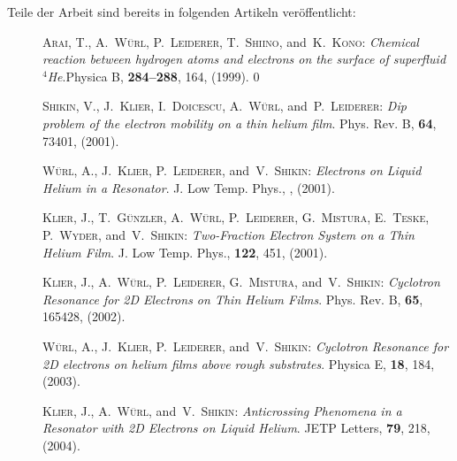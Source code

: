 Teile der Arbeit sind bereits in folgenden Artikeln veröffentlicht:

\begin{description}
	\item[\cite{Ara99}] \textsc{Arai, T.}, \textsc{A.~W{\"u}rl}, \textsc{P.~Leiderer}, \textsc{T.~Shiino}, and\ \textsc{K.~Kono}: {\em {C}hemical reaction between hydrogen atoms and electrons on the surface of superfluid {$^4$}{H}e}.\newblock Physica B, \textbf{284--288}, 164, (1999).
0
	\item[\cite{Shi01}] \textsc{Shikin, V.}, \textsc{J.~Klier}, \textsc{I.~Doicescu}, \textsc{A.~W{\"u}rl}, and\ \textsc{P.~Leiderer}: {\em {D}ip problem of the electron mobility on a thin helium film}. \newblock Phys. Rev. B, \textbf{64}, 73401, (2001).
	
	\item[\cite{Wue01}] \textsc{W{\"u}rl, A.}, \textsc{J.~Klier}, \textsc{P.~Leiderer}, and\ \textsc{V.~Shikin}: {\em {E}lectrons on {L}iquid {H}elium in a {R}esonator}. \newblock J. Low Temp. Phys., \textbf{}, (2001).
	
	\item[\cite{Kli01}] \textsc{Klier, J.}, \textsc{T.~G{\"u}nzler}, \textsc{A.~W{\"u}rl}, \textsc{P.~Leiderer}, \textsc{G.~Mistura}, \textsc{E.~Teske}, \textsc{P.~Wyder}, and\ \textsc{V.~Shikin}: {\em {T}wo-{F}raction {E}lectron {S}ystem on a {T}hin {H}elium {F}ilm}. \newblock J. Low Temp. Phys., \textbf{122}, 451, (2001).
	
	\item[\cite{Kli02}] \textsc{Klier, J.}, \textsc{A.~W{\"u}rl}, \textsc{P.~Leiderer}, \textsc{G.~Mistura}, and\ \textsc{V.~Shikin}: {\em {C}yclotron {R}esonance for 2{D} {E}lectrons on {T}hin {H}elium {F}ilms}. \newblock Phys. Rev. B, \textbf{65}, 165428, (2002).
	
	\item[\cite{Wue03}] \textsc{W{\"u}rl, A.}, \textsc{J.~Klier}, \textsc{P.~Leiderer}, and\ \textsc{V.~Shikin}: {\em {C}yclotron {R}esonance for 2{D} electrons on helium films above rough substrates}. \newblock Physica E, \textbf{18}, 184, (2003).
	
	\item[\cite{Kli04}] \textsc{Klier, J.}, \textsc{A.~W{\"u}rl}, and\ \textsc{V.~Shikin}: {\em {A}nticrossing {P}henomena in a {R}esonator with 2{D} {E}lectrons on {L}iquid {H}elium}. \newblock JETP Letters, \textbf{79}, 218, (2004).
\end{description}

